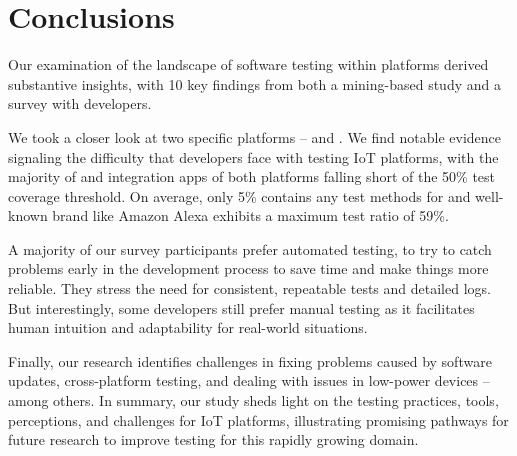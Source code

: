 \section{Conclusions}\label{sec:conclusions}

Our examination of the landscape of software testing within \iot platforms derived substantive insights, with 10 key findings from both a mining-based study and a survey with developers. 

We took a closer look at two specific platforms – \homeassistant and \openhab. 
We find notable evidence signaling the difficulty that developers face with testing IoT platforms, with the majority of \addons and integration apps of both platforms falling short of the 50\% test coverage threshold.
On average, only 5\% \addons contains any test methods for \openhab and well-known brand like Amazon Alexa exhibits a maximum test ratio of 59\%.

A majority of our survey participants prefer automated testing, to try to catch problems early in the development process to save time and make things more reliable. They stress the need for consistent, repeatable tests and detailed logs. But interestingly, some developers still prefer manual testing as it facilitates human intuition and adaptability for real-world situations.

Finally, our research identifies challenges in fixing problems caused by software updates, cross-platform testing, and dealing with issues in low-power devices -- among others. In summary, our study sheds light on the testing practices, tools, perceptions, and challenges for IoT platforms, illustrating promising pathways for future research to improve testing for this rapidly growing domain. 

